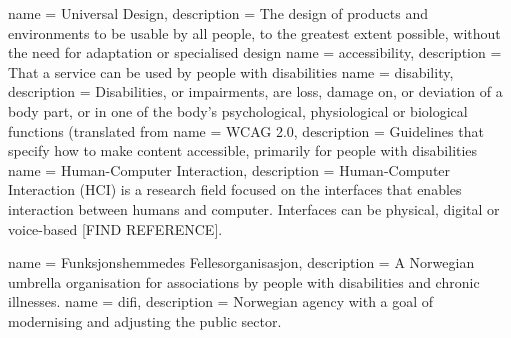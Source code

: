 {
    name = Universal Design,
    description = {The design of products and environments to be usable by all people, to the greatest extent possible, without the need for adaptation or specialised design \parencite{miljoverndepartementet_t-1468_2007}}
}
{
    name = accessibility,
    description = {That a service can be used by people with disabilities}
}
{
    name = disability,
    description = { Disabilities, or impairments, are loss, damage on, or deviation of a body part, or in one of the body's psychological, physiological or biological functions (translated from \cite{barne-_ungdoms-_og_familiedirektoratet_hva_2015}}
}
{
    name = WCAG 2.0,
    description = {Guidelines that specify how to make content accessible, primarily for people with disabilities}
}
{
    name = Human-Computer Interaction,
    description = {Human-Computer Interaction (HCI) is a research field focused on the interfaces that enables interaction between humans and computer. Interfaces can be physical, digital or voice-based [FIND REFERENCE].}
}

{
    name = Funksjonshemmedes Fellesorganisasjon,
    description = {A Norwegian umbrella organisation for associations by people with disabilities and chronic illnesses.}
}
{
    name =  difi,
    description = {Norwegian agency with a goal of modernising and adjusting the public sector. }
}


